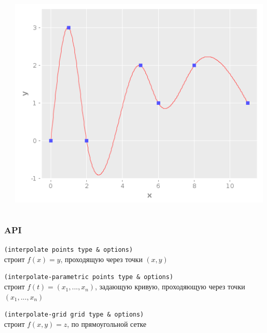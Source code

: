 \documentclass[rpussian]{beamer}
\begin{document}
\begin{frame}
\begin{columns}[c]
\begin{column}{.35\textwidth}
    \end{column}
    \begin{column}{.35\textwidth}
      \includegraphics[width=\textwidth,height=\textheight,keepaspectratio]{cubic_interpolation_1_var_small}
    \end{column}
  \end{columns}
\end{frame}

\begin{frame}[fragile]
  \frametitle{API}
  \verb+(interpolate points type & options)+ \\
  строит $f(x) = y$, проходящую через точки $(x, y)$ \\

  \vspace{1.2cm}

  \verb+(interpolate-parametric points type & options)+ \\
  строит $f(t) = (x_1, ..., x_n)$, задающую кривую, проходяющую через точки $(x_1, ..., x_n)$ \\

  \vspace{1.2cm}

  \verb+(interpolate-grid grid type & options)+ \\
  строит $f(x, y) = z$, по прямоугольной сетке
\end{frame}
\end{document}
